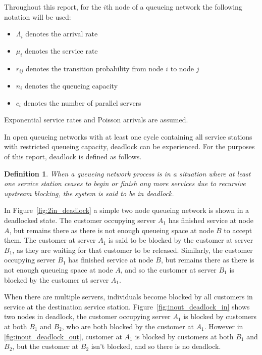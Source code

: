 \documentclass{article}
\newtheorem{definition}{Definition}
\begin{document}
Throughout this report, for the $i$th node of a queueing network the following notation will be used:

\begin{itemize}
  \item $\Lambda_i$ denotes the arrival rate
  \item $\mu_i$ denotes the service rate
  \item $r_{ij}$ denotes the transition probability from node $i$ to node $j$
  \item $n_i$ denotes the queueing capacity
  \item $c_i$ denotes the number of parallel servers
\end{itemize}

Exponential service rates and Poisson arrivals are assumed.

In open queueing networks with at least one cycle containing all service stations with restricted queueing capacity, deadlock can be experienced.
For the purposes of this report, deadlock is defined as follows.\\

\begin{definition}
    When a queueing network process is in a situation where at least one service station
    ceases to begin or finish any more services
    due to recursive upstream blocking, the system is said to be in deadlock.
\end{definition}

In Figure~\ref{fig:2in_deadlock} a simple two node queueing network is shown in a deadlocked state.
The customer occupying server $A_1$ has finished service at node $A$, but remains there as there is not
enough queueing space at node $B$ to accept them.
The customer at server $A_1$ is said to be blocked by the customer at server $B_1$, as they are waiting for that customer to be released.
Similarly, the customer occupying server $B_1$ has finished service at node $B$, but remains there as there is not enough queueing space at node $A$, and so the customer at server $B_1$ is blocked by the customer at server $A_1$.

When there are multiple servers, individuals become blocked by all customers in
service at the destination service station.
Figure~\ref{fig:inout_deadlock_in} shows two nodes in deadlock, the customer occupying server $A_1$ is blocked by customers at both $B_1$ and $B_2$, who are both blocked by the customer at $A_1$.
However in \ref{fig:inout_deadlock_out}, customer at $A_1$ is blocked by customers at both $B_1$ and $B_2$, but the customer at $B_2$ isn't blocked, and so there is no deadlock.
\end{document}

